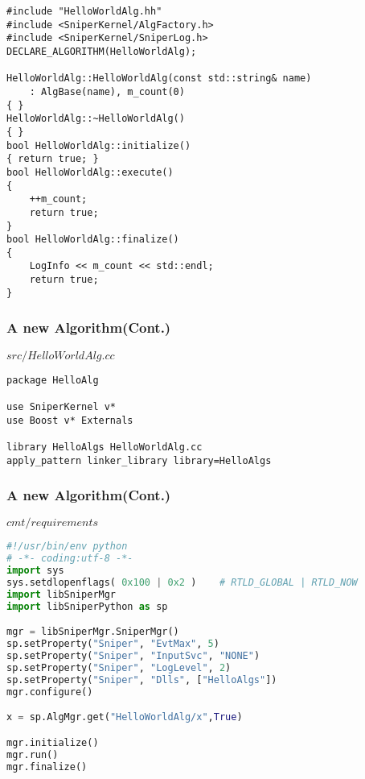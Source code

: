 \newsavebox{\createalgimpl}
\begin{lrbox}{\createalgimpl}
\begin{lstlisting}[linebackgroundcolor={\ifnum\value{lstnumber}=4\color{green}\fi}]
#include "HelloWorldAlg.hh"
#include <SniperKernel/AlgFactory.h>
#include <SniperKernel/SniperLog.h>
DECLARE_ALGORITHM(HelloWorldAlg);

HelloWorldAlg::HelloWorldAlg(const std::string& name)
    : AlgBase(name), m_count(0)
{ }
HelloWorldAlg::~HelloWorldAlg()
{ }
bool HelloWorldAlg::initialize()
{ return true; }
bool HelloWorldAlg::execute()
{ 
    ++m_count;
    return true; 
}
bool HelloWorldAlg::finalize()
{ 
    LogInfo << m_count << std::endl;
    return true; 
}
\end{lstlisting}
\end{lrbox}

\begin{frame}
    \frametitle{A new Algorithm(Cont.)}
    \begin{block}{\(src/HelloWorldAlg.cc\)}
        \par\usebox{\createalgimpl}
    \end{block}
\end{frame}

\newsavebox{\createalgcmt}
\begin{lrbox}{\createalgcmt}
\begin{lstlisting}
package HelloAlg

use SniperKernel v*
use Boost v* Externals

library HelloAlgs HelloWorldAlg.cc
apply_pattern linker_library library=HelloAlgs
\end{lstlisting}
\end{lrbox}

\begin{frame}
    \frametitle{A new Algorithm(Cont.)}
    \begin{block}{\(cmt/requirements\)}
        \par\usebox{\createalgcmt}
    \end{block}
\end{frame}

\newsavebox{\runalg}
\begin{lrbox}{\runalg}
\begin{lstlisting}[language=python]
#!/usr/bin/env python
# -*- coding:utf-8 -*-
import sys
sys.setdlopenflags( 0x100 | 0x2 )    # RTLD_GLOBAL | RTLD_NOW
import libSniperMgr
import libSniperPython as sp

mgr = libSniperMgr.SniperMgr()
sp.setProperty("Sniper", "EvtMax", 5)
sp.setProperty("Sniper", "InputSvc", "NONE")
sp.setProperty("Sniper", "LogLevel", 2)
sp.setProperty("Sniper", "Dlls", ["HelloAlgs"])
mgr.configure()

x = sp.AlgMgr.get("HelloWorldAlg/x",True)

mgr.initialize()
mgr.run()
mgr.finalize()
\end{lstlisting}
\end{lrbox}

